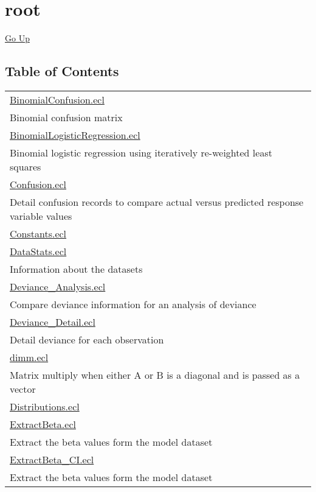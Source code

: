 \chapter*{\color{headtoc} root}
\hypertarget{ecldoc:toc:root}{}
\hyperlink{ecldoc:toc:}{Go Up}


\section*{Table of Contents}
{\renewcommand{\arraystretch}{1.5}
\begin{longtable}{|p{\textwidth}|}
\hline
\hyperlink{ecldoc:toc:BinomialConfusion}{BinomialConfusion.ecl} \\
Binomial confusion matrix \\
\hline
\hyperlink{ecldoc:toc:BinomialLogisticRegression}{BinomialLogisticRegression.ecl} \\
Binomial logistic regression using iteratively re-weighted least squares \\
\hline
\hyperlink{ecldoc:toc:Confusion}{Confusion.ecl} \\
Detail confusion records to compare actual versus predicted response variable values \\
\hline
\hyperlink{ecldoc:toc:Constants}{Constants.ecl} \\
\hline
\hyperlink{ecldoc:toc:DataStats}{DataStats.ecl} \\
Information about the datasets \\
\hline
\hyperlink{ecldoc:toc:Deviance_Analysis}{Deviance\_Analysis.ecl} \\
Compare deviance information for an analysis of deviance \\
\hline
\hyperlink{ecldoc:toc:Deviance_Detail}{Deviance\_Detail.ecl} \\
Detail deviance for each observation \\
\hline
\hyperlink{ecldoc:toc:dimm}{dimm.ecl} \\
Matrix multiply when either A or B is a diagonal and is passed as a vector \\
\hline
\hyperlink{ecldoc:toc:Distributions}{Distributions.ecl} \\
\hline
\hyperlink{ecldoc:toc:ExtractBeta}{ExtractBeta.ecl} \\
Extract the beta values form the model dataset \\
\hline
\hyperlink{ecldoc:toc:ExtractBeta_CI}{ExtractBeta\_CI.ecl} \\
Extract the beta values form the model dataset \\

\end{longtable}}
